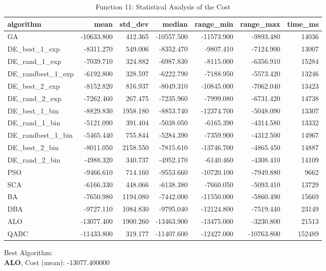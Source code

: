 \documentclass[12pt]{article}
\begin{document}
\begin{table}[H]
    \centering
    \footnotesize
    \begin{adjustbox}{width=1\textwidth}
\begin{tabular}{lrrrrrr}
\toprule
         algorithm &       mean &  std\_dev &     median &  range\_min &  range\_max &  time\_ms \\
\midrule
                GA & -10633.800 &  412.365 & -10557.500 & -11573.900 &  -9893.480 &    14036 \\
     DE\_best\_1\_exp &  -8311.270 &  549.006 &  -8352.470 &  -9807.410 &  -7124.900 &    13007 \\
     DE\_rand\_1\_exp &  -7039.710 &  324.882 &  -6987.830 &  -8115.000 &  -6356.910 &    15284 \\
 DE\_randbest\_1\_exp &  -6192.800 &  328.597 &  -6222.790 &  -7188.950 &  -5573.420 &    13246 \\
     DE\_best\_2\_exp &  -8152.820 &  816.937 &  -8049.310 & -10845.000 &  -7062.040 &    13423 \\
     DE\_rand\_2\_exp &  -7262.460 &  267.475 &  -7235.960 &  -7999.080 &  -6731.420 &    14738 \\
     DE\_best\_1\_bin &  -8829.830 & 1958.180 &  -8853.740 & -12374.700 &  -5048.090 &    13307 \\
     DE\_rand\_1\_bin &  -5121.090 &  391.404 &  -5038.050 &  -6165.390 &  -4314.580 &    13332 \\
 DE\_randbest\_1\_bin &  -5465.440 &  755.844 &  -5284.390 &  -7359.900 &  -4312.500 &    14967 \\
     DE\_best\_2\_bin &  -8011.050 & 2158.550 &  -7815.610 & -13746.700 &  -4865.450 &    14887 \\
     DE\_rand\_2\_bin &  -4988.320 &  340.737 &  -4952.170 &  -6140.460 &  -4308.410 &    14109 \\
               PSO &  -9466.610 &  714.160 &  -9553.660 & -10720.100 &  -7949.880 &     9662 \\
               SCA &  -6166.330 &  448.066 &  -6138.380 &  -7660.050 &  -5093.410 &    13729 \\
                BA &  -7650.980 & 1194.080 &  -7442.000 & -11550.000 &  -5860.490 &    15669 \\
               DBA &  -9727.110 & 1084.830 &  -9795.040 & -12124.800 &  -7519.440 &    23149 \\
               ALO & -13077.400 & 1900.260 & -13463.900 & -13475.000 &  -3230.800 &    21513 \\
              QABC & -11433.800 &  319.177 & -11407.600 & -12427.000 & -10763.800 &   152489 \\
\bottomrule
\end{tabular}


    \end{adjustbox}
    \caption{Function 11: Statistical Analysis of the Cost} 
    \end{table}
Best Algorithm: \\
\textbf{ALO}, Cost (mean): -13077.400000\\
\newpage
\end{document}
